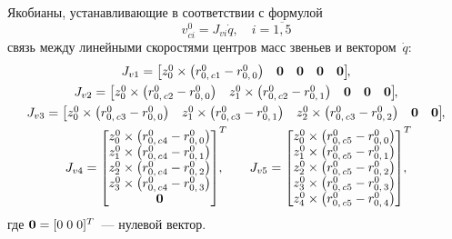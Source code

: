 Якобианы, устанавливающие в соответствии с формулой
\begin{equation}
    v^0_{ci} = J_{vi}\dot{q}, \quad i = \overline{1,5}
\end{equation}
связь между линейными скоростями центров масс звеньев и вектором~$\dot{q}$:
\begin{gather}
    J_{v1} =
    \begin{bmatrix}
        z^0_0 \times \left( r^0_{0,\,c1} - r^0_{0,\,0}\right) & \nv & \nv & \nv & \nv
    \end{bmatrix}\!\!,
    \\
    J_{v2} =
    \begin{bmatrix}
        z^0_0 \times \left( r^0_{0,\,c2} - r^0_{0,\,0}\right) & z^0_1 \times \left( r^0_{0,\,c2} - r^0_{0,\,1}\right) & \nv & \nv & \nv
    \end{bmatrix}\!\!,
    \\
    J_{v3} =
    \begin{bmatrix}
        z^0_0 \times \left( r^0_{0,\,c3} - r^0_{0,\,0}\right) & z^0_1 \times \left( r^0_{0,\,c3} - r^0_{0,\,1}\right) &
        z^0_2 \times \left( r^0_{0,\,c3} - r^0_{0,\,2}\right) & \nv & \nv
    \end{bmatrix}\!\!,
    \\
    J_{v4} =
    \begin{bmatrix}
        z^0_0 \times \left( r^0_{0,\,c4} - r^0_{0,\,0}\right) \\
        z^0_1 \times \left( r^0_{0,\,c4} - r^0_{0,\,1}\right) \\
        z^0_2 \times \left( r^0_{0,\,c4} - r^0_{0,\,2}\right) \\
        z^0_3 \times \left( r^0_{0,\,c4} - r^0_{0,\,3}\right) \\
        \nv
    \end{bmatrix}^T\!\!\!\!\!,
    \qquad
    J_{v5} =
    \begin{bmatrix}
        z^0_0 \times \left( r^0_{0,\,c5} - r^0_{0,\,0}\right) \\
        z^0_1 \times \left( r^0_{0,\,c5} - r^0_{0,\,1}\right) \\
        z^0_2 \times \left( r^0_{0,\,c5} - r^0_{0,\,2}\right) \\
        z^0_3 \times \left( r^0_{0,\,c5} - r^0_{0,\,3}\right) \\
        z^0_4 \times \left( r^0_{0,\,c5} - r^0_{0,\,4}\right)
    \end{bmatrix}^T\!\!\!\!\!,
\end{gather}
где $\mathbf0 = [0\;0\;0]^T$~--- нулевой вектор.


